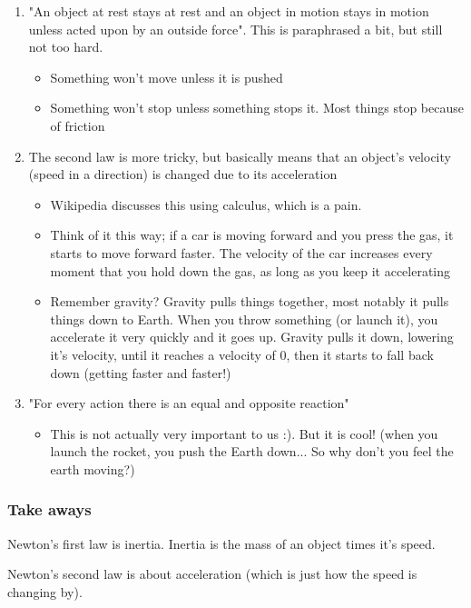 \documentclass{article}
\begin{document}
\begin{enumerate}
	\item "An object at rest stays at rest and an object in motion stays in motion unless acted upon by an outside force". This is paraphrased a bit, but still not too hard.
	\begin{itemize}
		\item Something won't move unless it is pushed
		\item Something won't stop unless something stops it. Most things stop because of friction
	\end{itemize}
	\item The second law is more tricky, but basically means that an object's velocity (speed in a direction) is changed due to its acceleration
	\begin{itemize}
		\item Wikipedia discusses this using calculus, which is a pain.
		\item Think of it this way; if a car is moving forward and you press the gas, it starts to move forward faster. The velocity of the car increases every moment that you hold down the gas, as long as you keep it accelerating
		\item Remember gravity? Gravity pulls things together, most notably it pulls things down to Earth. When you throw something (or launch it), you accelerate it very quickly and it goes up. Gravity pulls it down, lowering it's velocity, until it reaches a velocity of 0, then it starts to fall back down (getting faster and faster!)
	\end{itemize}
	\item "For every action there is an equal and opposite reaction"
	\begin{itemize}
		\item This is not actually very important to us :). But it is cool! (when you launch the rocket, you push the Earth down... So why don't you feel the earth moving?)
	\end{itemize}
\end{enumerate}

\subsubsection{Take aways}

Newton's first law is inertia. Inertia is the mass of an object times it's speed.

Newton's second law is about acceleration (which is just how the speed is changing by).
\end{document}
